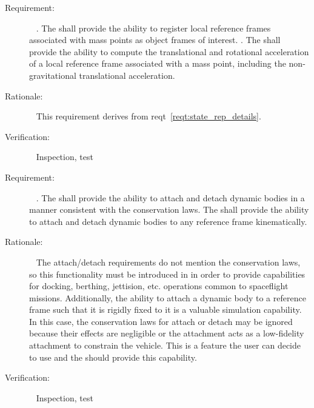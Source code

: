 \label{reqt:vehicle_points}
\begin{description}
\item[Requirement:]\ \newline
  \label{reqt:point_spec}.
    The \ModelDesc shall provide the ability to register local reference frames
    associated with mass points as object frames of interest.
  \label{reqt:point_accel}.
    The \ModelDesc shall provide the ability to compute the translational and
    rotational acceleration of a local reference frame associated with a mass
    point, including the non-gravitational translational acceleration.

\item[Rationale:]\ \newline
  This requirement derives from reqt~\ref{reqt:state_rep_details}.

\item[Verification:]\ \newline
  Inspection, test
\end{description}


\label{reqt:attach_detach}
\begin{description}
\item[Requirement:]\ \newline
  \label{reqt:dyn_attach_detach}.
    The \ModelDesc shall provide the ability to attach and detach dynamic
    bodies in a manner consistent with the conservation laws.
  \label{reqt:kin_attach_detach}
    The \ModelDesc shall provide the ability to attach and detach dynamic
    bodies to any reference frame kinematically.

\item[Rationale:]\ \newline
  The \MASS attach/detach requirements do not mention the
  conservation laws, so this functionality must be introduced in \ModelDesc in order to provide capabilities for docking,
  berthing, jettision, etc. operations common to spaceflight missions. \newline \newline
  Additionally, the ability to attach a dynamic body to a reference frame such that it is rigidly fixed to it is a 
  valuable simulation capability. In this case, the conservation laws for attach or detach may be ignored because their
  effects are negligible or the attachment acts as a low-fidelity attachment to constrain the vehicle. This is a feature
  the user can decide to use and the \ModelDesc should provide this capability.

\item[Verification:]\ \newline
  Inspection, test
\end{description}
